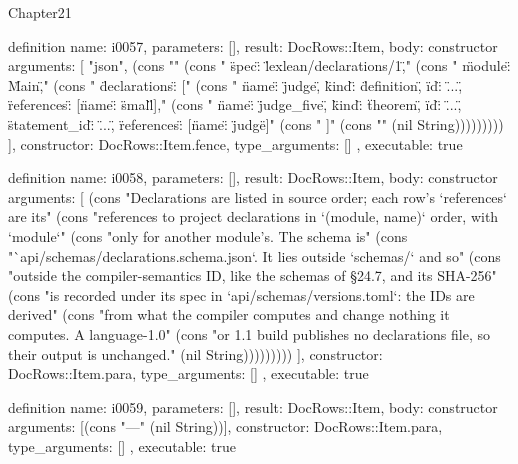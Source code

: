 \begin{lexlean}{Chapter21}
\begin{semanticmodule}
definition{
  name: i0057,
  parameters: [],
  result: DocRows::Item,
  body: constructor{
    arguments: [
      "json",
      (cons "{" (cons "  \"spec\": \"lexlean/declarations/1\"," (cons "  \"module\": \"Main\"," (cons "  \"declarations\": [" (cons "    {\"name\": \"judge\", \"kind\": \"definition\", \"id\": \"...\", \"references\": [{\"name\": \"small\"}]}," (cons "    {\"name\": \"judge_five\", \"kind\": \"theorem\", \"id\": \"...\", \"statement_id\": \"...\", \"references\": [{\"name\": \"judge\"}]}" (cons "  ]" (cons "}" (nil String)))))))))
    ],
    constructor: DocRows::Item.fence,
    type_arguments: []
  },
  executable: true
}

definition{
  name: i0058,
  parameters: [],
  result: DocRows::Item,
  body: constructor{
    arguments: [
      (cons "Declarations are listed in source order; each row's `references` are its" (cons "references to project declarations in `(module, name)` order, with `module`" (cons "only for another module's. The schema is" (cons "`api/schemas/declarations.schema.json`. It lies outside `schemas/` and so" (cons "outside the compiler-semantics ID, like the schemas of §24.7, and its SHA-256" (cons "is recorded under its spec in `api/schemas/versions.toml`: the IDs are derived" (cons "from what the compiler computes and change nothing it computes. A language-1.0" (cons "or 1.1 build publishes no declarations file, so their output is unchanged." (nil String)))))))))
    ],
    constructor: DocRows::Item.para,
    type_arguments: []
  },
  executable: true
}

definition{
  name: i0059,
  parameters: [],
  result: DocRows::Item,
  body: constructor{
    arguments: [(cons "---" (nil String))],
    constructor: DocRows::Item.para,
    type_arguments: []
  },
  executable: true
}
\end{semanticmodule}
\end{lexlean}
